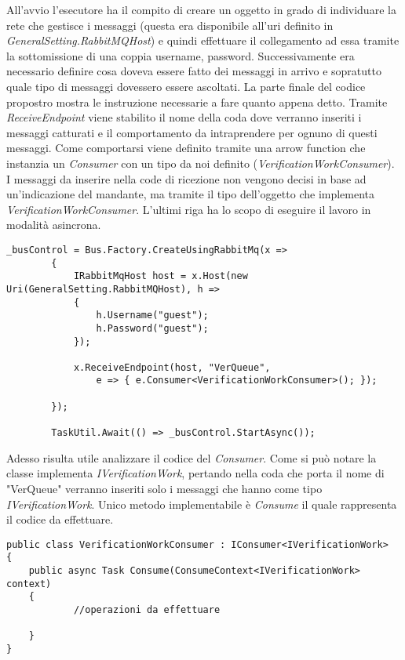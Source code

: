 All'avvio l'esecutore ha il compito di creare un oggetto in grado di individuare la rete che gestisce i messaggi (questa era disponibile all'uri definito in \emph{GeneralSetting.RabbitMQHost}) e quindi effettuare il collegamento ad essa tramite la sottomissione di una coppia username, password.
Successivamente era necessario definire cosa doveva essere fatto dei messaggi in arrivo e sopratutto quale tipo di messaggi dovessero essere ascoltati. La parte finale del codice propostro mostra le instruzione necessarie a fare quanto appena detto. Tramite \emph{ReceiveEndpoint} viene stabilito il nome della coda dove verranno inseriti i messaggi catturati e il comportamento da intraprendere per ognuno di questi messaggi. Come comportarsi viene definito tramite una arrow function che instanzia un \emph{Consumer} con un tipo da noi definito (\emph{VerificationWorkConsumer}). I messaggi da inserire nella code di ricezione non vengono decisi in base ad un'indicazione del mandante, ma tramite il tipo dell'oggetto che implementa \emph{VerificationWorkConsumer}.
L'ultimi riga ha lo scopo di eseguire il lavoro in modalità asincrona.
\begin{lstlisting}[caption={creazione di un collegamento a \emph{RabbitMQ}}]
    _busControl = Bus.Factory.CreateUsingRabbitMq(x =>
        {
            IRabbitMqHost host = x.Host(new Uri(GeneralSetting.RabbitMQHost), h =>
            {
                h.Username("guest");
                h.Password("guest");
            });
            
            x.ReceiveEndpoint(host, "VerQueue",
                e => { e.Consumer<VerificationWorkConsumer>(); });
            
        });

        TaskUtil.Await(() => _busControl.StartAsync());
\end{lstlisting}

Adesso risulta utile analizzare il codice del \emph{Consumer}. Come si può notare la classe implementa \emph{IVerificationWork}, pertando nella coda che porta il nome di "VerQueue" verranno inseriti solo i messaggi che hanno come tipo \emph{IVerificationWork}.
Unico metodo implementabile è \emph{Consume} il quale rappresenta il codice da effettuare.

\begin{lstlisting}[caption={esempio di \emph{Consumer}}]
public class VerificationWorkConsumer : IConsumer<IVerificationWork>
{
    public async Task Consume(ConsumeContext<IVerificationWork> context)
    {
            //operazioni da effettuare

    }
}
\end{lstlisting}

